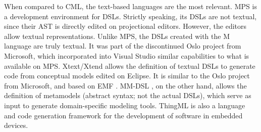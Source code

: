 \documentclass[a0,portrait]{a0poster}
\begin{document}
\begin{multicols}{3}
When compared to CML, the text-based languages are the most relevant.
MPS \cite{voelter} is a development environment for DSLs.
Strictly speaking, its DSLs are not textual,
since their AST is directly edited on projectional editors.
However, the editors allow textual representations.
Unlike MPS,
the DSLs created with the M language \cite{mlang} are truly textual.
It was part of the discontinued Oslo project from Microsoft,
which incorporated into Visual Studio similar capabilities to what is available on MPS.
Xtext/Xtend \cite{xtext} allows the definition of textual DSLs
to generate code from conceptual models edited on Eclipse.
It is similar to the Oslo project from Microsoft,
and based on EMF \cite{emf}.
MM-DSL \cite{mm-dsl}, on the other hand,
allows the definition of metamodels (abstract syntax; not the actual DSLs),
which serve as input to generate domain-specific modeling tools.
ThingML \cite{thingml} is also a language and code generation framework for
the development of software in embedded devices.

\color{DarkSlateGray} %


\nocite{*} %


\end{multicols}
\end{document}
